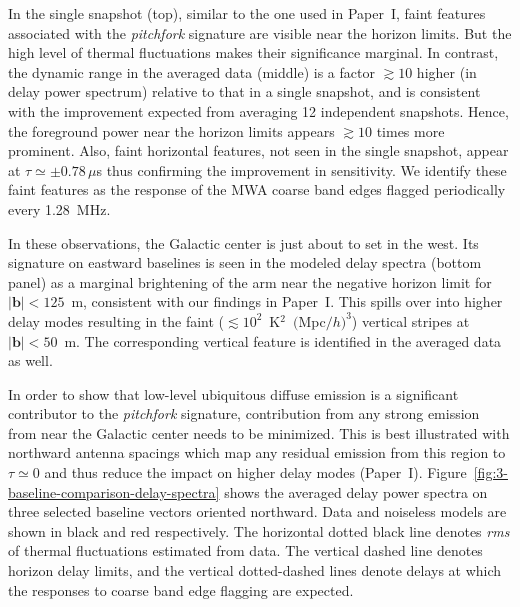 \documentclass[preprint2,apjl,numberedappendix,twocolappendix,appendixfloats]{emulateapj}
\begin{document}
\begin{figure}[htb]
\end{figure}

In the single snapshot (top), similar to the one used in Paper~I, faint features associated with the {\it pitchfork} signature are visible near the horizon limits. But the high level of thermal fluctuations makes their significance marginal. In contrast, the dynamic range in the averaged data (middle) is a factor $\gtrsim 10$ higher (in delay power spectrum) relative to that in a single snapshot, and is consistent with the improvement expected from averaging 12 independent snapshots. Hence, the foreground power near the horizon limits appears $\gtrsim 10$ times more prominent. Also, faint horizontal features, not seen in the single snapshot, appear at $\tau \simeq \pm 0.78\,\mu$s thus confirming the improvement in sensitivity. We identify these faint features as the response of the MWA coarse band edges flagged periodically every 1.28~MHz. 

In these observations, the Galactic center is just about to set in the west. Its signature on eastward baselines is seen in the modeled delay spectra (bottom panel) as a marginal brightening of the arm near the negative horizon limit for $|\boldsymbol{b}| < 125$~m, consistent with our findings in Paper~I. This spills over into higher delay modes resulting in the faint ($\lesssim 10^2$~K$^2$~$($Mpc$/h)^3$) vertical stripes at $|\boldsymbol{b}| < 50$~m. The corresponding vertical feature is identified in the averaged data as well.

In order to show that low-level ubiquitous diffuse emission is a significant contributor to the {\it pitchfork} signature, contribution from any strong emission from near the Galactic center needs to be minimized. This is best illustrated with northward antenna spacings which map any residual emission from this region to $\tau\simeq 0$ and thus reduce the impact on higher delay modes (Paper~I). Figure~\ref{fig:3-baseline-comparison-delay-spectra} shows the averaged delay power spectra on three selected baseline vectors oriented northward. Data and noiseless models are shown in black and red respectively. The horizontal dotted black line denotes {\it rms} of thermal fluctuations estimated from data. The vertical dashed line denotes horizon delay limits, and the vertical dotted-dashed lines denote delays at which the responses to coarse band edge flagging are expected.
\end{document}
